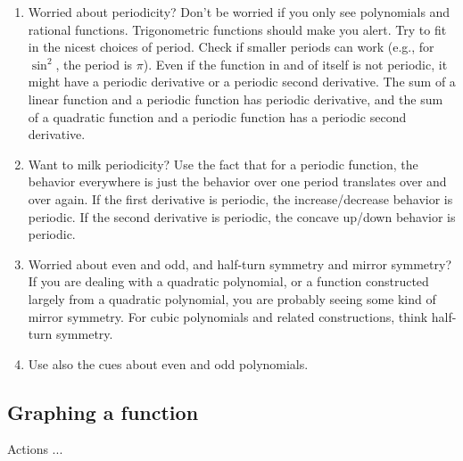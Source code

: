 \documentclass[10pt]{amsart}
\begin{document}
\begin{enumerate}
\item Worried about periodicity? Don't be worried if you only see
  polynomials and rational functions. Trigonometric functions should
  make you alert. Try to fit in the nicest choices of period. Check if
  smaller periods can work (e.g., for $\sin^2$, the period is
  $\pi$). Even if the function in and of itself is not periodic, it
  might have a periodic derivative or a periodic second
  derivative. The sum of a linear function and a periodic function has
  periodic derivative, and the sum of a quadratic function and a
  periodic function has a periodic second derivative.
\item Want to milk periodicity? Use the fact that for a periodic
  function, the behavior everywhere is just the behavior over one
  period translates over and over again. If the first derivative is
  periodic, the increase/decrease behavior is periodic. If the second
  derivative is periodic, the concave up/down behavior is periodic.
\item Worried about even and odd, and half-turn symmetry and mirror
  symmetry? If you are dealing with a quadratic polynomial, or a
  function constructed largely from a quadratic polynomial, you are
  probably seeing some kind of mirror symmetry. For cubic polynomials
  and related constructions, think half-turn symmetry.
\item Use also the cues about even and odd polynomials.
\end{enumerate}

\subsection{Graphing a function}

Actions ...
\end{document}
